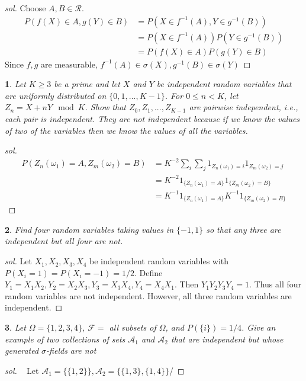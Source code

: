 \documentclass{report}
\newtheorem{ex}{}[section]
\begin{document}
\begin{proof}[sol]
Choose $A,B \in \mathcal{R}$.
\begin{align*}
    P(f(X)\in A, g(Y)\in B) &= P(X\in f^{-1}(A), Y \in g^{-1}(B))\\
    &= P(X\in f^{-1}(A))P(Y \in g^{-1}(B))\\
    &= P(f(X)\in A)P(g(Y) \in B)
\end{align*}
Since $f,g$ are measurable, $f^{-1}(A) \in \sigma(X), g^{-1}(B) \in \sigma(Y)$
\end{proof}
\begin{ex}
Let $K \ge 3$ be a prime and let $X$ and $Y$ be independent random variables that are uniformly distributed on $\{0, 1, . . . ,K-1\}$. For $0 \le n < K$, let $Z_n = X + nY \mod K$. Show that $Z_0,Z_1, ...,Z_{K-1}$ are pairwise independent, i.e., each pair is independent. They are not independent because if we know the values of two of the variables then we know the values of all the variables.
\end{ex}
\begin{proof}[sol]
\begin{align*}
    P(Z_n(\omega_1) = A, Z_m(\omega_2) = B) &= K^{-2}\sum_i\sum_j 1_{Z_n(\omega_1) = i}1_{Z_m(\omega_2) = j}\\
    &= K^{-2}1_{\{Z_n(\omega_1) = A\}}1_{\{Z_m(\omega_2) = B\}}\\
    &= K^{-1}1_{\{Z_n(\omega_1) = A\}}K^{-1}1_{\{Z_m(\omega_2) = B\}}
\end{align*}
\end{proof}
\begin{ex}
Find four random variables taking values in $\{-1, 1\}$ so that any three are independent but all four are not.
\end{ex}
\begin{proof}[sol]
 Let $X_1,X_2,X_3,X_4$ be independent random variables with $P(X_i = 1) = P(X_i = -1) = 1/2$. Define $Y_1 = X_1X_2, Y_2 = X_2X_3, Y_3 = X_3X_4, Y_4 = X_4X_1$. Then $Y_1Y_2Y_3Y_4  = 1$. Thus all four random variables are not independent. However, all three random variables are independent.
\end{proof}
\begin{ex}
Let $\Omega = \{1,2,3,4\}$, $\mathcal{F} = $ all subsets of $\Omega$, and $P(\{i\}) = 1/4$. Give an example of two collections of sets $\mathcal{A}_1$ and $\mathcal{A}_2$ that are independent but whose generated $\sigma$-fields are not 
\end{ex}
\begin{proof}[sol]~
Let $\mathcal{A}_1 = \{\{1,2\}\}, \mathcal{A}_2 = \{\{1,3\}, \{1,4\}\}$/
\end{proof}
\end{document}
